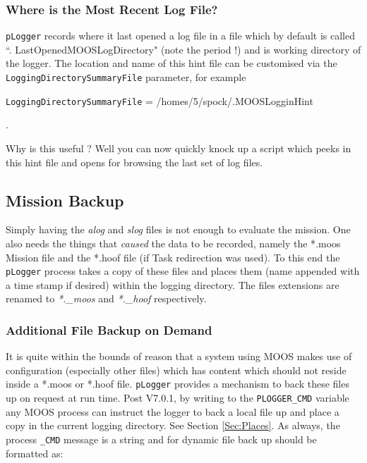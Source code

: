 \documentclass[a4paper,10pt]{article}
\newcommand{\Code}[1]{\texttt{#1} }
\newcommand{\code}[1]{\Code{#1} }
\begin{document}
\subsubsection{Where is the Most Recent Log File?}


\code{pLogger} records where it last opened a log file in a file which by default is called ``. LastOpenedMOOSLogDirectory" (note the period !) and is working directory of the logger. The location and name of this hint file can be customised via the \code{LoggingDirectorySummaryFile} parameter, for example

\begin{center}
\code{LoggingDirectorySummaryFile} =  /homes/5/spock/.MOOSLogginHint
\end{center}.

Why is this useful ? Well you can now quickly knock up a script which peeks in this hint file and opens for browsing the last set of log files.




\subsection{Mission Backup}
Simply having the {\it{alog}} and {\it{slog}} files is not enough
to evaluate the mission. One also needs the things that
{\em{caused}} the data to be recorded, namely the *.moos Mission
file and the *.hoof file (if Task redirection was used). To this
end the \code{pLogger} process takes a copy of these files and
places them (name appended with a time stamp if desired) within
the logging directory. The files extensions are renamed to
{\it{*.\_moos}} and {\it{*.\_hoof}} respectively.

\subsubsection{Additional File Backup on Demand}
It is quite within the bounds of reason that a system using MOOS makes use of
configuration (especially other files) which has content which should not reside inside a *.moos or *.hoof file.
\code{pLogger} provides a mechanism to back these files up on request at run time. Post V7.0.1, by writing to the \code{PLOGGER\_CMD}
variable any MOOS process can instruct the logger to back a local file up and place a copy in the current logging directory. See Section \ref{Sec:Places}. As always, the process \code{\_CMD} message is a string and for dynamic file back up should be formatted as:
\end{document}
